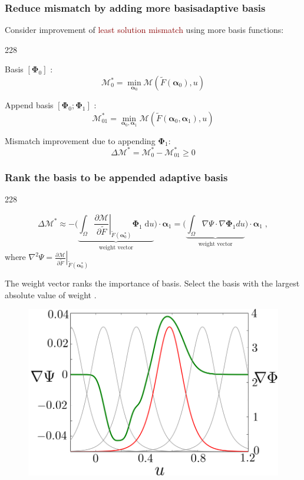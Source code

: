\documentclass{beamer}
\let\oldcite=\cite
\renewcommand{\cite}[1]{\textcolor[rgb]{.4,.4,.85}{\oldcite{#1}}}
\newcommand{\barrow}{\item[\color{darkred}\ding{228}]}
\begin{document}
\begin{frame}
    \frametitle{Reduce mismatch by adding more basis\hfill \scriptsize{adaptive basis}} \small
    Consider improvement of \textcolor{darkred}{least solution mismatch} using more basis functions:\\
    \begin{dinglist}{228}
    \barrow
    Basis $\left[\boldsymbol{\Phi}_0\right]$ :
    $$
        \mathcal{M}^*_0 = \min_{\boldsymbol{\alpha}_0}
        \mathcal{M}\left(
        \tilde{F}(\boldsymbol{\alpha}_0), u\right)
    $$
    \barrow
    Append basis $\left[ \boldsymbol{\Phi}_0; \boldsymbol{\Phi}_1\right]$ :
    $$
        \mathcal{M}^*_{01} = \min_{
        \boldsymbol{\alpha}_0 , \boldsymbol{\alpha}_1}
        \mathcal{M}\left(
        \tilde{F}(\boldsymbol{\alpha}_0, 
                  \boldsymbol{\alpha}_1), u\right)
    $$
    \barrow
    Mismatch improvement due to appending $\boldsymbol{\Phi}_1$:
    $$
        \Delta\mathcal{M}^*= \mathcal{M}^*_0
        - \mathcal{M}^*_{01} \ge 0
    $$
    \end{dinglist}
\end{frame}


\begin{frame}
    \frametitle{Rank the basis to be appended \hfill\scriptsize{adaptive basis}} \small
    \begin{dinglist}{228}
    \barrow
    $$
        \Delta\mathcal{M}^* \approx -\Big(\underbrace{\int_\Omega \left.\frac{\partial\mathcal{M}}{\partial \tilde{F}}
        \right|_{\tilde{F}(\boldsymbol{\alpha}_0^*)} \boldsymbol{\Phi}_1
        \; \textrm{d} u}_{\textrm{weight vector}} \Big) \cdot \boldsymbol{\alpha}_1 
        = \Big( \underbrace{
          \int_\Omega \nabla \Psi \cdot \nabla \boldsymbol{\Phi}_1 d u}_{
          \textrm{weight vector}}\Big) \cdot 
        \boldsymbol{\alpha}_1  \;, 
    $$  
    where $\nabla^2 \Psi = \left.\frac{\partial\mathcal{M}}{\partial \tilde{F}}
        \right|_{\tilde{F}(\boldsymbol{\alpha}_0^*)}$
    \barrow
    The weight vector ranks the importance of basis. Select the basis with the largest absolute value of weight \scriptsize\cite{Miller 90} \small.
    \end{dinglist}
    \begin{figure}[H]\begin{center}
        \includegraphics[width=5.cm]{adaptive_basis.png}
    \end{center}\end{figure}
\end{frame}
\end{document}
